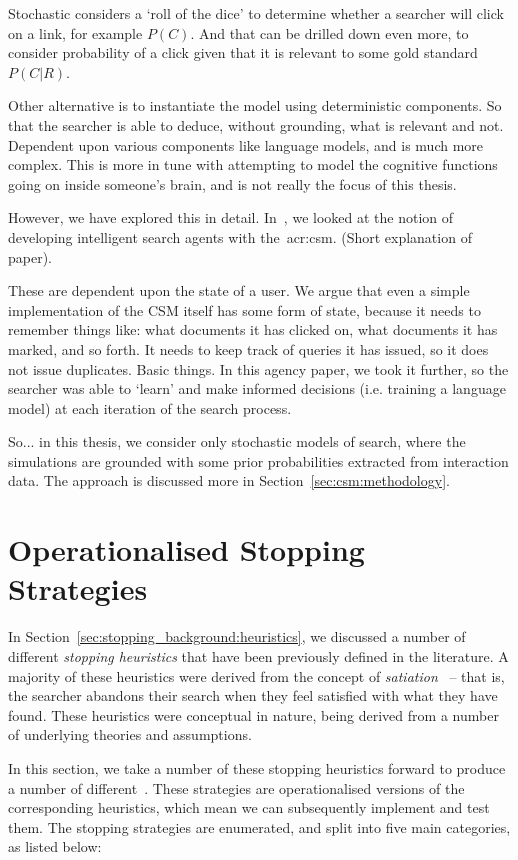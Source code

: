 Stochastic considers a `roll of the dice' to determine whether a searcher will click on a link, for example $P(C)$. And that can be drilled down even more, to consider probability of a click given that it is relevant to some gold standard $P(C|R)$.

Other alternative is to instantiate the model using deterministic components.
So that the searcher is able to deduce, without grounding, what is relevant and not. Dependent upon various components like language models, and is much more complex. This is more in tune with attempting to model the cognitive functions going on inside someone's brain, and is not really the focus of this thesis.

However, we have explored this in detail. In~\cite{maxwell2016agents}, we looked at the notion of developing intelligent search agents with the~\gls{acr:csm}. (Short explanation of paper).

These are dependent upon the state of a user. We argue that even a simple implementation of the CSM itself has some form of state, because it needs to remember things like: what documents it has clicked on, what documents it has marked, and so forth. It needs to keep track of queries it has issued, so it does not issue duplicates. Basic things. In this agency paper, we took it further, so the searcher was able to `learn' and make informed decisions (i.e. training a language model) at each iteration of the search process.

So... in this thesis, we consider only stochastic models of search, where the simulations are grounded with some prior probabilities extracted from interaction data. The approach is discussed more in Section~\ref{sec:csm:methodology}.


\section{Operationalised Stopping Strategies}\label{sec:csm:stopping}
In Section~\ref{sec:stopping_background:heuristics}, we discussed a number of different \emph{stopping heuristics} that have been previously defined in the literature. A majority of these heuristics were derived from the concept of \emph{satiation}~\citep{simon1955satiation} -- that is, the searcher abandons their search when they feel satisfied with what they have found. These heuristics were conceptual in nature, being derived from a number of underlying theories and assumptions.

In this section, we take a number of these stopping heuristics forward to produce a number of different~. These strategies are operationalised versions of the corresponding heuristics, which mean we can subsequently implement and test them. The stopping strategies are enumerated, and split into five main categories, as listed below:


